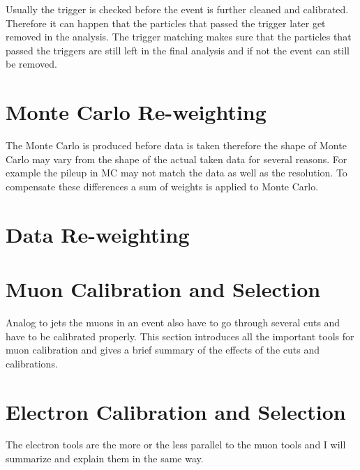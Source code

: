 Usually the trigger is checked before the event is further cleaned and calibrated. Therefore it can happen that the particles that passed the trigger later get removed in the analysis. The trigger matching makes sure that the particles that passed the triggers are still left in the final analysis and if not the event can still be removed.

\section{Monte Carlo Re-weighting}

The Monte Carlo is produced before data is taken therefore the shape of Monte Carlo may vary from the shape of the actual taken data for several reasons. For example the pileup in MC may not match the data as well as the resolution. To compensate these differences a sum of weights is applied to Monte Carlo.

\section{Data Re-weighting}

\section{Muon Calibration and Selection}

Analog to jets the muons in an event also have to go through several cuts and have to be calibrated properly. This section introduces all the important tools for muon calibration and gives a brief summary of the effects of the cuts and calibrations.

\section{Electron Calibration and Selection}

The electron tools are the more or the less parallel to the muon tools and I will summarize and explain them in the same way.